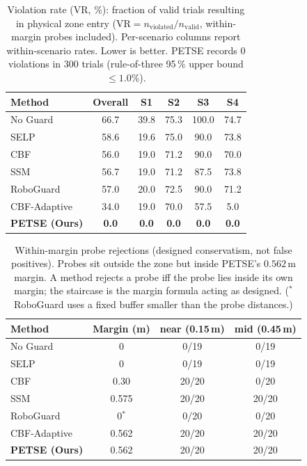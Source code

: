 \documentclass[journal,twoside,web]{ieeecolor}
\newcommand{\tblstyle}{\small\setlength{\tabcolsep}{4pt}}
\begin{document}
\begin{table}[t]
\centering
\tblstyle
\caption{Violation rate (VR, \%): fraction of valid trials resulting in physical zone entry ($\text{VR} = n_{\text{violated}} / n_{\text{valid}}$, within-margin probes included). Per-scenario columns report within-scenario rates. Lower is better. PETSE records $0$ violations in $300$ trials (rule-of-three 95\,\% upper bound $\le 1.0\%$).}
\label{tab:vr}
\footnotesize
\begin{tabular}{@{}l ccccc@{}}
\toprule
Method & Overall & S1 & S2 & S3 & S4 \\
\midrule
No Guard              & 66.7 & 39.8 &  75.3 & 100.0 & 74.7 \\
SELP                  & 58.6 & 19.6 &  75.0 &  90.0 & 73.8 \\
CBF                   & 56.0 & 19.0 &  71.2 &  90.0 & 70.0 \\
SSM                   & 56.7 & 19.0 &  71.2 &  87.5 & 73.8 \\
RoboGuard             & 57.0 & 20.0 &  72.5 &  90.0 & 71.2 \\
CBF-Adaptive          & 34.0 & 19.0 &  70.0 &  57.5 &  5.0 \\
\rowcolor{lightgray} \textbf{PETSE (Ours)} & \textbf{0.0} & \textbf{0.0} &
\textbf{0.0} & \textbf{0.0} & \textbf{0.0} \\
\bottomrule
\end{tabular}
\end{table}

\begin{table}[t]
\centering
\tblstyle
\caption{Within-margin probe rejections (designed conservatism, not false positives). Probes sit outside the zone but inside PETSE's $0.562$\,m margin. A method rejects a probe iff the probe lies inside its own margin; the staircase is the margin formula acting as designed. ($^{*}$RoboGuard uses a fixed buffer smaller than the probe distances.)}
\label{tab:probes}
\footnotesize
\begin{tabular}{@{}l c cc@{}}
\toprule
Method & Margin (m) & near (0.15\,m) & mid (0.45\,m) \\
\midrule
No Guard & 0 & 0/19 & 0/19 \\
SELP & 0 & 0/19 & 0/19 \\
CBF & 0.30 & 20/20 & 0/20 \\
SSM & 0.575 & 20/20 & 20/20 \\
RoboGuard & 0$^{*}$ & 0/20 & 0/20 \\
CBF-Adaptive & 0.562 & 20/20 & 20/20 \\
\rowcolor{lightgray} \textbf{PETSE (Ours)} & 0.562 & 20/20 & 20/20 \\
\bottomrule
\end{tabular}
\end{table}
\end{document}
